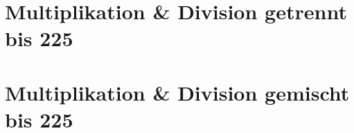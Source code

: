 \documentclass[version=last,paper=A4,fontsize=14pt,DIV=18]{scrartcl}
\begin{document}
	\section*{Multiplikation \& Division getrennt bis 225}
	
	
	
	
	\pagebreak
	
	\section*{Multiplikation \& Division gemischt bis 225}

	
	
\end{document}
